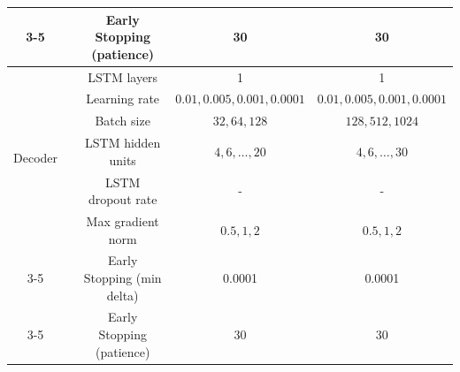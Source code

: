 \documentclass{article}
\theoremstyle{plain}
\theoremstyle{definition}
\theoremstyle{remark}
\begin{document}
\begin{table}[!htbp]
{\begin{tabular}{|c|c|c|c|c|}
\cline{3-5}
& & Early Stopping (patience) & 30 & 30 \\
\hline
\multirow{6}{*}{Decoder} 
& & LSTM layers & 1 & 1 \\
\cline{3-5}
& & Learning rate & $0.01, 0.005, 0.001, 0.0001$ & $0.01, 0.005, 0.001, 0.0001$ \\
\cline{3-5}
& & Batch size & $32, 64, 128$ & $128, 512, 1024$ \\
\cline{3-5}
& & LSTM hidden units & $4, 6, \dots, 20$ & $4, 6, \dots, 30$ \\
\cline{3-5}
& & LSTM dropout rate & - & - \\
\cline{3-5}
& & Max gradient norm & $0.5, 1, 2$ & $0.5, 1, 2$ \\
\cline{3-5}
& & Early Stopping (min delta) & 0.0001 & 0.0001 \\
\cline{3-5}
& & Early Stopping (patience) & 30 & 30 \\
\hline
\end{tabular}%
}
\end{table}
\end{document}
